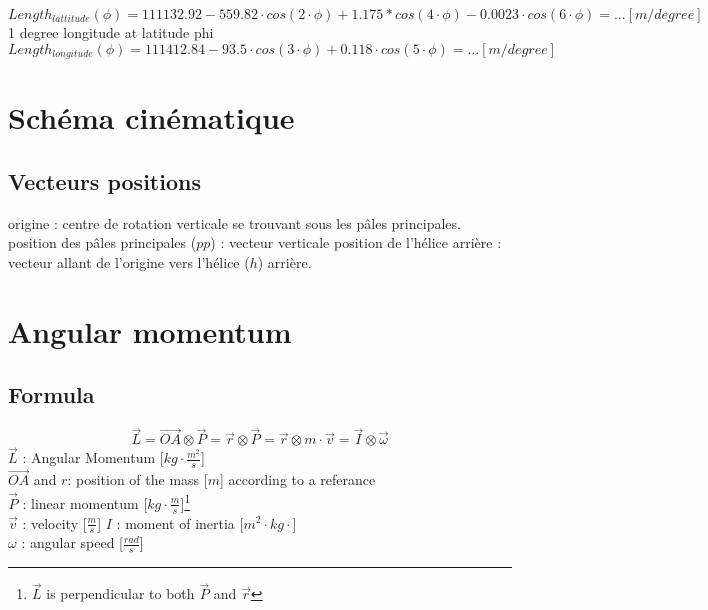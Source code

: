 \documentclass[12pt,a4paper]{article}
\begin{document}
	
	
	\begin{equation}
		Length_{lattitude}(\phi) = 111132.92-559.82 \cdot cos(2 \cdot \phi)+1.175*cos(4 \cdot \phi)-0.0023 \cdot cos(6 \cdot \phi)= ... [m/degree]
	\end{equation}
	1 degree longitude at latitude phi
	\begin{equation}
		Length_{longitude}(\phi) =
		111412.84-93.5 \cdot cos(3 \cdot \phi)+ 0.118 \cdot cos(5 \cdot \phi)= ... [m/degree]
	\end{equation}
	
	\newpage
	\section{Schéma cinématique}
	
	
	\subsection{Vecteurs positions}
	origine : centre de rotation verticale se trouvant sous les pâles principales.
	\medbreak
	position  des pâles principales ($pp$) : vecteur verticale
	\medbreak
	position de l'hélice arrière : 
	vecteur allant de l'origine vers l'hélice ($h$) arrière. 
	
	
	\newpage
	\section{Angular momentum}
	
	\subsection{Formula}
	\begin{equation}
		\vec{L}=\vec{OA} \otimes \vec{P}=\vec{r} \otimes \vec{P}=\vec{r} \otimes m \cdot \vec{v}=\vec{I} \otimes \vec{\omega}
	\end{equation}
	$\vec{L}$ : Angular Momentum [$kg \cdot \frac{m^2}{s}$]\\
	$\vec{OA}$ and $r$: position of the mass [$m$] according to a referance\\
	$\vec{P}$ : linear momentum [$kg\cdot \frac{m}{s}$]\footnote{$\vec{L}$ is perpendicular to both $\vec{P}$ and $\vec{r}$}\\
	$\vec{v}$ : velocity [$\frac{m}{s}$]
	$I$ : moment of inertia [$m^2 \cdot kg \cdot$]\\
	$\omega$ : angular speed [$\frac{rad}{s}$]
	
\end{document}
